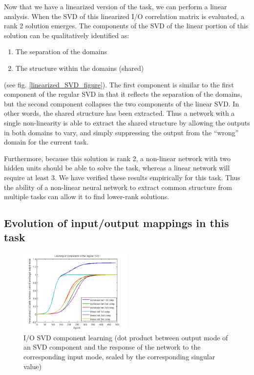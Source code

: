 \documentclass[10pt,letterpaper]{article}
\begin{document}
Now that we have a linearized version of the task, we can perform a linear analysis. When the SVD of this linearized I/O correlation matrix is evaluated, a rank 2 solution emerges. The components of the SVD of the linear portion of this solution can be qualitatively identified as: \begin{enumerate}
\item The separation of the domains
\item The structure within the domains (shared)
\end{enumerate}
(see fig. \ref{linearized_SVD_figure}). The first component is similar to the first component of the regular SVD in that it reflects the separation of the domains, but the second component collapses the two components of the linear SVD. In other words, the shared structure has been extracted. Thus a network with a single non-linearity is able to extract the shared structure by allowing the outputs in both domains to vary, and simply suppressing the output from the ``wrong'' domain for the current task.\par
Furthermore, because this solution is rank 2, a non-linear network with two hidden units should be able to solve the task, whereas a linear network will require at least 3. We have verified these results empirically for this task. Thus the ability of a non-linear neural network to extract common structure from multiple tasks can allow it to find lower-rank solutions.
 
 
\subsection{Evolution of input/output mappings in this task}
\begin{figure}
\centering
\includegraphics[width=0.5\textwidth]{figures/regular_SVD_component_learning.png}
\caption{I/O SVD component learning (dot product between output mode of an SVD component and the response of the network to the corresponding input mode, scaled by the corresponding singular value)}
\label{regular_SVD_component_learning}
\end{figure}
\end{document}
